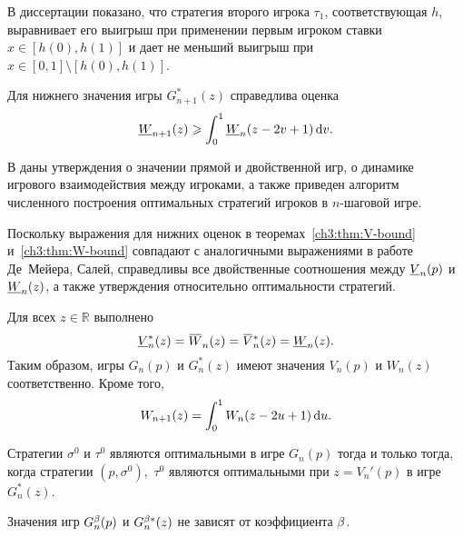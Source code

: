 В диссертации показано, что стратегия второго игрока $\tau_1$, соответствующая $h$, выравнивает его выигрыш при применении первым игроком ставки $x \in [h(0), h(1)]$ и дает не меньший выигрыш при $x \in [0, 1] \setminus [h(0), h(1)]$.

\begin{theorem}\label{ch3:thm:W-bound}
  Для нижнего значения игры $G_{n+1}^*(z)$ справедлива оценка
  \begin{equation*}
    \LW{n+1}(z) \geqslant \int_0^1 \LW{n}(z - 2v + 1) \di v.
  \end{equation*}
\end{theorem}

В  даны утверждения о значении прямой и двойственной игр, о динамике игрового взаимодействия между игроками, а также приведен алгоритм численного построения оптимальных стратегий игроков в $n$-шаговой игре.

Поскольку выражения для нижних оценок в теоремах~\ref{ch3:thm:V-bound} и~\ref{ch3:thm:W-bound} совпадают с аналогичными выражениями в работе Де~Мейера, Салей, справедливы все двойственные соотношения между $\LV{n}(p)$ и $\LW{n}(z)$, а также утверждения относительно оптимальности стратегий.

\begin{theorem}
  Для всех $z \in \mathbb{R}$ выполнено
  \begin{equation}\label{ch3:eq:duality-relationships}
    \LV[*]{n}(z) = \HW{n}(z) = \HV[*]{n}(z) = \LW{n}(z).
  \end{equation}
  Таким образом, игры $G_n(p)$ и $G_n^*(z)$ имеют значения $V_n(p)$ и $W_n(z)$ соответственно.
  Кроме того,
  \begin{equation}\label{ch3:eq:W-recursive}
    W_{n+1}(z) = \int_0^1 W_n(z - 2u + 1) \mathop{}\!\mathrm{d} u.
  \end{equation}
\end{theorem}

\begin{theorem}\label{ch3:thm:optimal-strategies}
  Стратегии $\sigma^0$ и $\tau^0$ являются оптимальными в игре $G_n(p)$ тогда и только тогда, когда стратегии $(p, \sigma^0),$ $\tau^0$ являются оптимальными при $z = V_n'(p)$ в игре $G_n^*(z)$.
\end{theorem}

\begin{corollary}
  \label{ch3:cor:value-indep-beta}
  Значения игр $G^{\beta}_n(p)$ и $G^{\beta*}_n(z)$ не зависят от коэффициента $\beta$.
\end{corollary}

